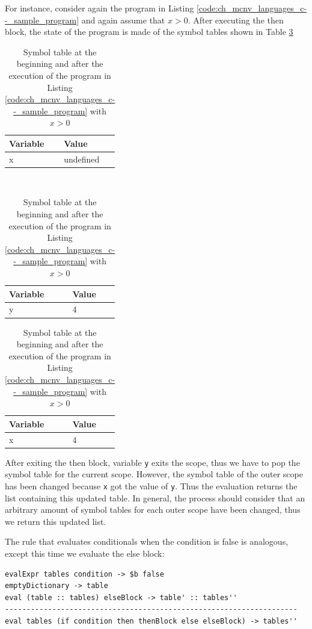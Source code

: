 For instance, consider again the program in Listing \ref{code:ch_mcnv_languages_c--_sample_program} and again assume that $x > 0$. After executing the then block, the state of the program is made of the symbol tables shown in Table \ref{tab:ch_mcnv_languages_tables_ifthenelse}

\begin{table}
	\centering
	\begin{tabular}{|l|l|}
		\hline
		\textbf{Variable} & \textbf{Value} \\
		\hline
		x & undefined\\
		\hline
	\end{tabular}\\
	\vspace{0.2cm}
	\begin{tabular}{|l|l|}
		\hline
		\textbf{Variable} & \textbf{Value} \\
		\hline
		y & 4\\
		\hline
	\end{tabular}
	\begin{tabular}{|l|l|}
		\hline
		\textbf{Variable} & \textbf{Value} \\
		\hline
		x & 4\\
		\hline
	\end{tabular}
	\caption{Symbol table at the beginning and after the execution of the program in Listing \ref{code:ch_mcnv_languages_c--_sample_program} with $x > 0$}
	\label{tab:ch_mcnv_languages_tables_ifthenelse}
\end{table}

\noindent
After exiting the then block, variable \texttt{y} exits the scope, thus we have to pop the symbol table for the current scope. However, the symbol table of the outer scope has been changed because \texttt{x} got the value of \texttt{y}. Thus the evaluation returns the list containing this updated table. In general, the process should consider that an arbitrary amount of symbol tables for each outer scope have been changed, thus we return this updated list.

The rule that evaluates conditionals when the condition is false is analogous, except this time we evaluate the else block:

\begin{lstlisting}
evalExpr tables condition -> $b false
emptyDictionary -> table
eval (table :: tables) elseBlock -> table' :: tables''
--------------------------------------------------------------------
eval tables (if condition then thenBlock else elseBlock) -> tables''
\end{lstlisting}

